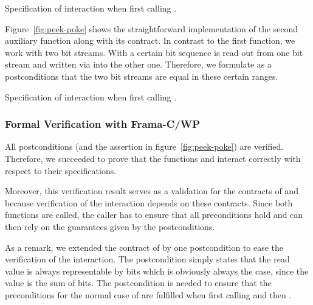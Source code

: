 \begin{listing}[hbt]
\begin{minipage}{\textwidth}

\end{minipage}
\caption{\label{fig:poke-peek} Specification of interaction when first calling \poke.}
\end{listing}

Figure~\ref{fig:peek-poke} shows the straightforward implementation 
of the second auxiliary function along with its \acsl contract.
In contrast to the first function, we work with two bit streams.
With \peek a certain bit sequence is read out from one bit stream
and written via \poke into the other one.
Therefore, we formulate as a postconditions that
the two bit streams are equal in these certain ranges.

\begin{listing}[hbt]
\begin{minipage}{\textwidth}

\end{minipage}
\caption{\label{fig:peek-poke} Specification of interaction when first calling \peek.}
\end{listing}

 \FloatBarrier

\subsubsection{Formal Verification with Frama-C/WP}

All postconditions (and the assertion in figure~\ref{fig:peek-poke})
are verified. Therefore, we succeeded to prove that the 
functions \peek and \poke interact correctly
with respect to their specifications.

Moreover, this verification result serves as a validation for the contracts
of \peek and \poke because verification of the interaction 
depends on these contracts. Since both functions are called,
the caller has to ensure that all preconditions hold
and can then rely on the guarantees given by the postconditions.

As a remark, we extended the contract of \peek by one postcondition 
to ease the verification of the interaction.
The postcondition simply states that the read value is always representable 
by  bits which is obviously always the case,
since the value is the sum of  bits.
The postcondition is needed to ensure that the preconditions for the normal case
of \poke are fulfilled when first calling \peek and then \poke.


